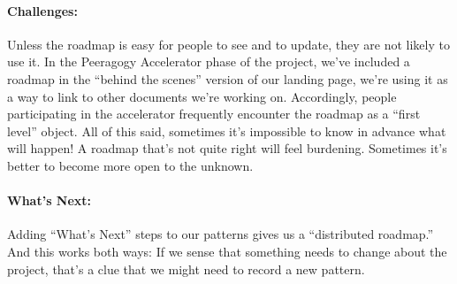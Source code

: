 \paragraph{Challenges:} Unless the roadmap is easy for people to see and to
update, they are not likely to use it. In the Peeragogy Accelerator
phase of the project, we've included a roadmap in the ``behind the
scenes'' version of our landing page, we're using it as a way to link to
other documents we're working on. Accordingly, people participating in
the accelerator frequently encounter the roadmap as a ``first level''
object. All of this said, sometimes it's impossible to know in advance
what will happen! A roadmap that's not quite right will feel burdening.
Sometimes it's better to become more open to the unknown.

\paragraph{What's Next:} 
Adding ``What's Next'' steps to our patterns gives us a ``distributed
roadmap.''  And this works both ways: If we sense that something needs
to change about the project, that's a clue that we might need to
record a new pattern.
